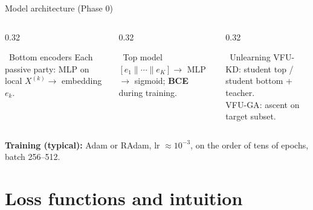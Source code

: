 \documentclass[aspectratio=169, 11pt]{beamer}
\begin{document}
\begin{frame}{Model architecture (Phase 0)}
  \begin{columns}[T]
    \begin{column}{0.32\textwidth}
      \begin{block}{\faLayerGroup\ Bottom encoders}
        \footnotesize
        Each passive party: MLP on local $X^{(k)} \to$ embedding $e_k$.
      \end{block}
    \end{column}
    \begin{column}{0.32\textwidth}
      \begin{exampleblock}{\faSitemap\ Top model}
        \footnotesize
        $[e_1 \| \cdots \| e_K] \to$ MLP $\to$ sigmoid; \textbf{BCE} during training.
      \end{exampleblock}
    \end{column}
    \begin{column}{0.32\textwidth}
      \begin{alertblock}{\faCogs\ Unlearning}
        \footnotesize
        \textsc{VFU-KD}: student top / student bottom + teacher.\\
        \textsc{VFU-GA}: ascent on target subset.
      \end{alertblock}
    \end{column}
  \end{columns}
  \vspace{0.4em}
  \begin{center}
    \footnotesize
    \colorbox{yellow!25}{\textbf{Training (typical):} Adam or RAdam, lr $\approx 10^{-3}$, on the order of tens of epochs, batch 256--512.}
  \end{center}
\end{frame}

\section{Loss functions and intuition}
\end{document}
